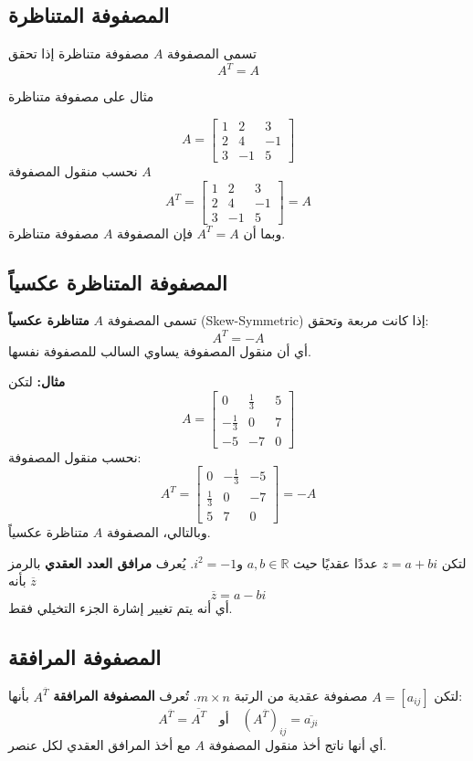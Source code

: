 	\subsection{المصفوفة المتناظرة}
	تسمى المصفوفة $A$ مصفوفة متناظرة إذا تحقق
	\[
	A^T = A
	\]\begin{example}
		
		مثال على مصفوفة متناظرة
		
		\[
		A=
		\begin{bmatrix}
			1 & 2 & 3\\
			2 & 4 & -1\\
			3 & -1 & 5
		\end{bmatrix}
		\]
		نحسب منقول المصفوفة \(A\)
		\[
		A^T=
		\begin{bmatrix}
			1 & 2 & 3\\
			2 & 4 & -1\\
			3 & -1 & 5
		\end{bmatrix}
		= A
		\]
		وبما أن
		$A^T = A$
		فإن المصفوفة \(A\) مصفوفة متناظرة.
		
	\end{example}
	\subsection{المصفوفة المتناظرة عكسياً}
	تسمى المصفوفة $A$ \textbf{متناظرة عكسياً} (Skew-Symmetric) إذا كانت مربعة وتحقق:
	\[
	A^T = -A
	\]
	أي أن منقول المصفوفة يساوي السالب للمصفوفة نفسها.
	
	\noindent\textbf{مثال:}  
	لتكن
	\[
	A =
	\begin{bmatrix}
		0 & \frac{1}{3} & 5 \\
		-\frac{1}{3} & 0 & 7 \\
		-5 & -7 & 0
	\end{bmatrix}
	\]
	نحسب منقول المصفوفة:
	\[
	A^T =
	\begin{bmatrix}
		0 & -\frac{1}{3} & -5 \\
		\frac{1}{3} & 0 & -7 \\
		5 & 7 & 0
	\end{bmatrix} = -A
	\]
	وبالتالي، المصفوفة $A$ متناظرة عكسياً.
	
	
	\begin{definition}
		لتكن $z = a + bi$ عددًا عقديًا حيث $a,b \in \mathbb{R}$ و$i^2=-1$.  
		يُعرف \textbf{مرافق العدد العقدي} بالرمز $\overline{z}$ بأنه
		\[
		\overline{z} = a - bi
		\]
		أي أنه يتم تغيير إشارة الجزء التخيلي فقط.
	\end{definition}
	\subsection{المصفوفة المرافقة}
	لتكن $A = [a_{ij}]$ مصفوفة عقدية من الرتبة $m \times n$.  
	تُعرف \textbf{المصفوفة المرافقة} $A^{\overline{T}}$ بأنها:
	\[
	A^{\overline{T}} = \overline{A^T} \quad \text{أو} \quad (A^{\overline{T}})_{ij} = \overline{a_{ji}}
	\]
	أي أنها ناتج أخذ منقول المصفوفة $A$ مع أخذ المرافق العقدي لكل عنصر.
	
